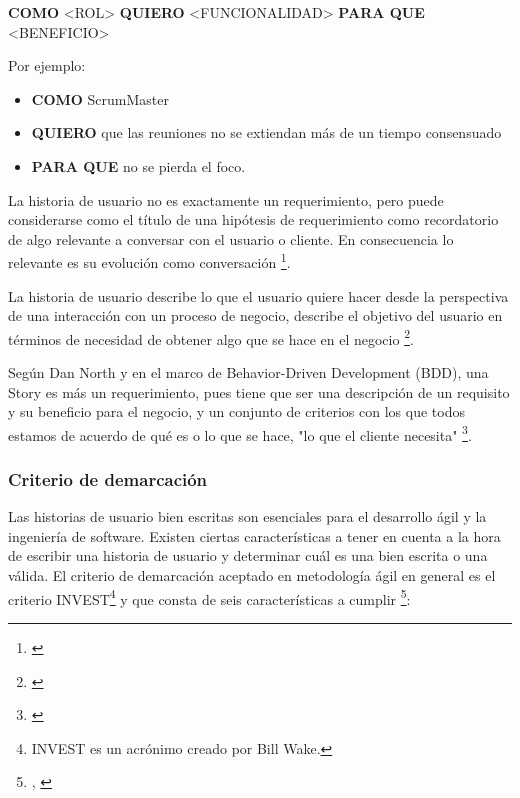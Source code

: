 \textbf{COMO} <ROL> \textbf{QUIERO} <FUNCIONALIDAD> \textbf{PARA QUE} <BENEFICIO>\newline

Por ejemplo:

\begin{itemize}
\item \textbf{COMO} ScrumMaster 
\item \textbf{QUIERO} que las reuniones no se extiendan más de un tiempo consensuado 
\item \textbf{PARA QUE} no se pierda el foco.
\end{itemize}

La historia de usuario no es exactamente un requerimiento, pero puede considerarse como el título de una hipótesis de requerimiento como recordatorio de algo relevante a conversar con el usuario o cliente. En consecuencia lo relevante es su evolución como conversación \footnote{\cite{UNTREF-2014}}.

La historia de usuario describe lo que el usuario quiere hacer desde la perspectiva de una interacción con un proceso de negocio, describe el objetivo del usuario en términos de necesidad de obtener algo que se hace en el negocio \footnote{\cite{Scott-Bellware-2008}}.

Según Dan North y en el marco de Behavior-Driven Development (BDD), una Story es más un requerimiento, pues tiene que ser una descripción de un requisito y su beneficio para el negocio, y un conjunto de criterios con los que todos estamos de acuerdo de qué es o lo que se hace, "lo que el cliente necesita" \footnote{\cite{Dan-North-2015}}. 

\subsubsection{Criterio de demarcación}

Las historias de usuario bien escritas son esenciales para el desarrollo ágil y la ingeniería de software. Existen ciertas características a tener en cuenta a la hora de escribir una historia de usuario y determinar cuál es una bien escrita o una válida. El criterio de demarcación aceptado en metodología ágil en general es el criterio INVEST\footnote{INVEST es un acrónimo creado por Bill Wake.} y que consta de seis características a cumplir \footnote{\cite{UNTREF-2014}, \cite{Scrum-Alliance-2015}}:


